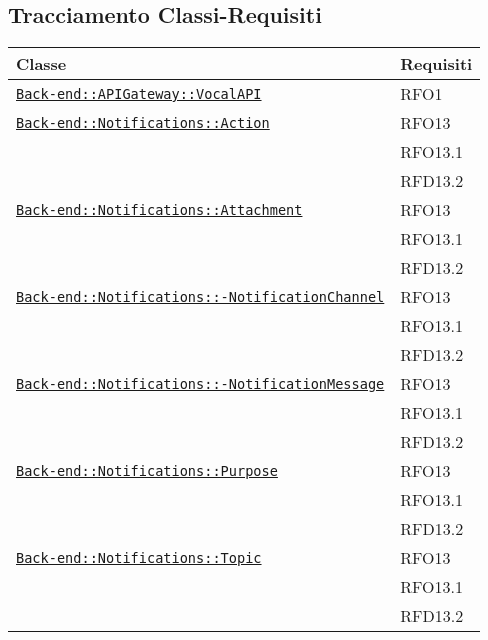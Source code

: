 \subsection{Tracciamento Classi-Requisiti}
\normalsize
\begin{longtable}{|>{\centering}m{10cm}|m{3cm}<{\centering}|}
\hline 
\textbf{Classe} & \textbf{Requisiti}\\
\hline
\endhead
\hyperref[Back-end::APIGateway::VocalAPI]{\texttt{Back-end::APIGateway::VocalAPI}} & RFO1\\ \hline

\hyperref[Back-end::Notifications::Action]{\texttt{Back-end::Notifications::Action}} & RFO13\\
& RFO13.1\\
& RFD13.2\\ \hline

\hyperref[Back-end::Notifications::Attachment]{\texttt{Back-end::Notifications::Attachment}} & RFO13\\
& RFO13.1\\
& RFD13.2\\ \hline

\hyperref[Back-end::Notifications::NotificationChannel]{\texttt{Back-end::Notifications::-\linebreak NotificationChannel}} & RFO13\\
& RFO13.1\\
& RFD13.2\\ \hline

\hyperref[Back-end::Notifications::NotificationMessage]{\texttt{Back-end::Notifications::-\linebreak NotificationMessage}} & RFO13\\
& RFO13.1\\
& RFD13.2\\ \hline

\hyperref[Back-end::Notifications::Purpose]{\texttt{Back-end::Notifications::Purpose}} & RFO13\\
& RFO13.1\\
& RFD13.2\\ \hline

\hyperref[Back-end::Notifications::Topic]{\texttt{Back-end::Notifications::Topic}} & RFO13\\
& RFO13.1\\
& RFD13.2\\ \hline


\end{longtable}
